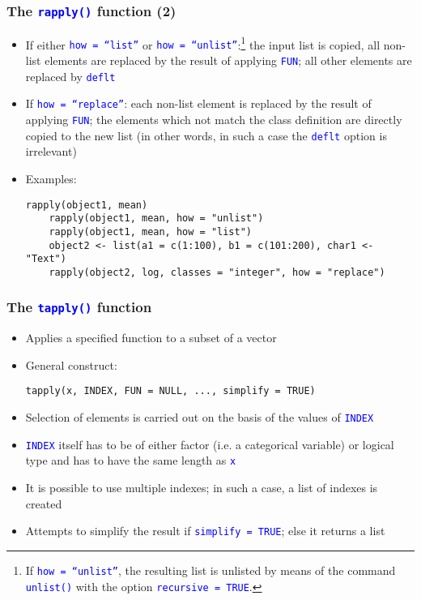 \documentclass[10pt]{beamer}
\newcommand{\cc}[1]{\texttt{\textcolor{blue}{#1}}}
\theoremstyle{definition}
\begin{document}
\begin{frame}[fragile]
\frametitle{The \cc{rapply()} function (2)}
\begin{itemize}
	\item If either \cc{how = ``list''} or \cc{how = ``unlist''}:\footnote{If \cc{how = ``unlist''}, the resulting list is unlisted by means of the command \cc{unlist()} with the option \cc{recursive = TRUE}.} the input list is copied, all non-list elements are replaced by the result of applying \cc{FUN}; all other elements are replaced by \cc{deflt}
	\item If \cc{how = ``replace''}: each non-list element is replaced by the result of applying \cc{FUN}; the elements which not match the class definition are directly copied to the new list (in other words, in such a case the \cc{deflt} option is irrelevant)
	\item Examples:
	\begin{lstlisting}[style = rstyle, breaklines]
	rapply(object1, mean)
	rapply(object1, mean, how = "unlist")
	rapply(object1, mean, how = "list")
	object2 <- list(a1 = c(1:100), b1 = c(101:200), char1 <- "Text")
	rapply(object2, log, classes = "integer", how = "replace")
	\end{lstlisting}
\end{itemize}
\end{frame}

\begin{frame}[fragile]
\frametitle{The \cc{tapply()} function}
\begin{itemize}
	\item Applies a specified function to a subset of a vector
	\item General construct:
	\begin{lstlisting}[style = rstyle, breaklines]
	tapply(x, INDEX, FUN = NULL, ..., simplify = TRUE)
	\end{lstlisting}
	\item Selection of elements is carried out on the basis of the values of \cc{INDEX}
	\item \cc{INDEX} itself has to be of either factor (i.e. a categorical variable) or logical type and has to have the same length as \cc{x}
	\item It is possible to use multiple indexes; in such a case, a list of indexes is created
	\item Attempts to simplify the result if \cc{simplify = TRUE}; else it returns a list
\end{itemize}
\end{frame}
\end{document}
